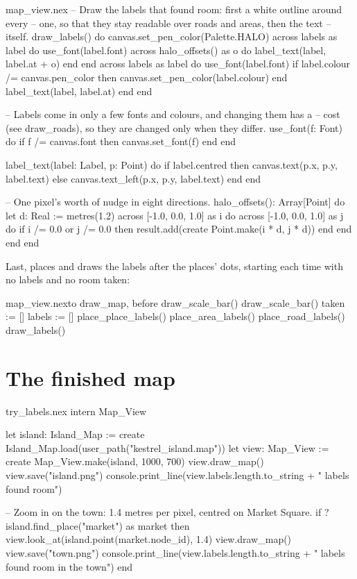\begin{continued}{map_view.nex}
  -- Draw the labels that found room: first a white outline around every
  -- one, so that they stay readable over roads and areas, then the text
  -- itself.
  draw_labels() do
    canvas.set_pen_color(Palette.HALO)
    across labels as label do
      use_font(label.font)
      across halo_offsets() as o do
        label_text(label, label.at + o)
      end
    end
    across labels as label do
      use_font(label.font)
      if label.colour /= canvas.pen_color then
        canvas.set_pen_color(label.colour)
      end
      label_text(label, label.at)
    end
  end

  -- Labels come in only a few fonts and colours, and changing them has a
  -- cost (see draw_roads), so they are changed only when they differ.
  use_font(f: Font) do
    if f /= canvas.font then
      canvas.set_font(f)
    end
  end

  label_text(label: Label, p: Point) do
    if label.centred then
      canvas.text(p.x, p.y, label.text)
    else
      canvas.text_left(p.x, p.y, label.text)
    end
  end

  -- One pixel's worth of nudge in eight directions.
  halo_offsets(): Array[Point] do
    let d: Real := metres(1.2)
    across [-1.0, 0.0, 1.0] as i do
      across [-1.0, 0.0, 1.0] as j do
        if i /= 0.0 or j /= 0.0 then
          result.add(create Point.make(i * d, j * d))
        end
      end
    end
  end
\end{continued}

Last,  places and draws the labels after the places' dots,
starting each time with no labels and no room taken:

\begin{tightaddbefore}{map_view.nex}{to draw_map, before draw_scale_bar()}{    draw_scale_bar()}
    taken := []
    labels := []
    place_place_labels()
    place_area_labels()
    place_road_labels()
    draw_labels()
\end{tightaddbefore}

\section{The finished map}

\begin{tryit}{try_labels.nex}
intern Map_View

let island: Island_Map := create Island_Map.load(user_path("kestrel_island.map"))
let view: Map_View := create Map_View.make(island, 1000, 700)
view.draw_map()
view.save("island.png")
console.print_line(view.labels.length.to_string + " labels found room")

-- Zoom in on the town: 1.4 metres per pixel, centred on Market Square.
if ?island.find_place("market") as market then
  view.look_at(island.point(market.node_id), 1.4)
  view.draw_map()
  view.save("town.png")
  console.print_line(view.labels.length.to_string + " labels found room in the town")
end
\end{tryit}

